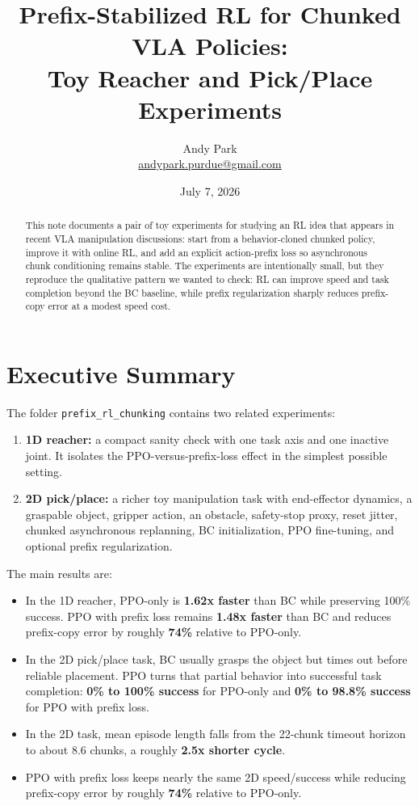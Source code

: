 \documentclass[11pt]{article}
\title{Prefix-Stabilized RL for Chunked VLA Policies:\\Toy Reacher and Pick/Place Experiments}
\author{Andy Park\\\href{mailto:andypark.purdue@gmail.com}{andypark.purdue@gmail.com}}
\date{July 7, 2026}
\begin{document}
\maketitle

\begin{abstract}
This note documents a pair of toy experiments for studying an RL idea that appears in recent VLA manipulation discussions: start from a behavior-cloned chunked policy, improve it with online RL, and add an explicit action-prefix loss so asynchronous chunk conditioning remains stable. The experiments are intentionally small, but they reproduce the qualitative pattern we wanted to check: RL can improve speed and task completion beyond the BC baseline, while prefix regularization sharply reduces prefix-copy error at a modest speed cost.
\end{abstract}

\section{Executive Summary}

The folder \texttt{prefix\_rl\_chunking} contains two related experiments:
\begin{enumerate}[leftmargin=1.5em]
  \item \textbf{1D reacher:} a compact sanity check with one task axis and one inactive joint. It isolates the PPO-versus-prefix-loss effect in the simplest possible setting.
  \item \textbf{2D pick/place:} a richer toy manipulation task with end-effector dynamics, a graspable object, gripper action, an obstacle, safety-stop proxy, reset jitter, chunked asynchronous replanning, BC initialization, PPO fine-tuning, and optional prefix regularization.
\end{enumerate}

The main results are:
\begin{itemize}[leftmargin=1.5em]
  \item In the 1D reacher, PPO-only is \textbf{1.62x faster} than BC while preserving 100\% success. PPO with prefix loss remains \textbf{1.48x faster} than BC and reduces prefix-copy error by roughly \textbf{74\%} relative to PPO-only.
  \item In the 2D pick/place task, BC usually grasps the object but times out before reliable placement. PPO turns that partial behavior into successful task completion: \textbf{0\% to 100\% success} for PPO-only and \textbf{0\% to 98.8\% success} for PPO with prefix loss.
  \item In the 2D task, mean episode length falls from the 22-chunk timeout horizon to about 8.6 chunks, a roughly \textbf{2.5x shorter cycle}.
  \item PPO with prefix loss keeps nearly the same 2D speed/success while reducing prefix-copy error by roughly \textbf{74\%} relative to PPO-only.
\end{itemize}
\end{document}
